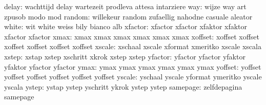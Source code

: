                     delay: wachttijd                 delay
                           wartezeit                 prodleva
                           attesa                    intarziere
                      way: wijze                     way
                           art                       zpusob
                           modo                      mod
                   random: willekeur                 random
                           zufaellig                 nahodne
                           casuale                   aleator
                    white: wit                       white
                           weiss                     bily
                           bianco                    alb
                  xfactor: xfactor                   xfactor
                           xfaktor                   xfaktor
                           xfactor                   xfactor %
                     xmax: xmax                      xmax
                           xmax                      xmax
                           xmax                      xmax %
                  xoffset: xoffset                   xoffset
                           xoffset                   xoffset
                           xoffset                   xoffset %
                   xscale: xschaal                   xscale
                           xformat                   xmeritko
                           xscale                    xscala %
                    xstep: xstap                     xstep
                           xschritt                  xkrok
                           xstep                     xstep %
                  yfactor: yfactor                   yfactor
                           yfaktor                   yfaktor
                           yfactor                   yfactor %
                     ymax: ymax                      ymax
                           ymax                      ymax
                           ymax                      ymax %
                  yoffset: yoffset                   yoffset
                           yoffset                   yoffset
                           yoffset                   yoffset %
                   yscale: yschaal                   yscale
                           yformat                   ymeritko
                           yscale                    yscala %
                    ystep: ystap                     ystep
                           yschritt                  ykrok
                           ystep                     ystep %
                 samepage: zelfdepagina              samepage
